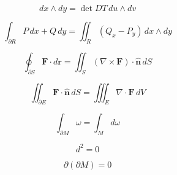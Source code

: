 \[
\boxed{
    dx\wedge dy
    =
    \det DT\,du\wedge dv
}
\]

\[
\boxed{
    \int_{\partial R}P\,dx+Q\,dy
    =
    \iint_R(Q_x-P_y)\,dx\wedge dy
}
\]

\[
\boxed{
    \oint_{\partial S}\mathbf F\cdot d\mathbf r
    =
    \iint_S(\nabla\times\mathbf F)\cdot\widehat{\mathbf n}\,dS
}
\]

\[
\boxed{
    \iint_{\partial E}\mathbf F\cdot\widehat{\mathbf n}\,dS
    =
    \iiint_E\nabla\cdot\mathbf F\,dV
}
\]

\[
\boxed{
    \int_{\partial M}\omega=\int_M d\omega
}
\]

\[
\boxed{
    d^2=0
}
\]

\[
\boxed{
    \partial(\partial M)=0
}
\]
